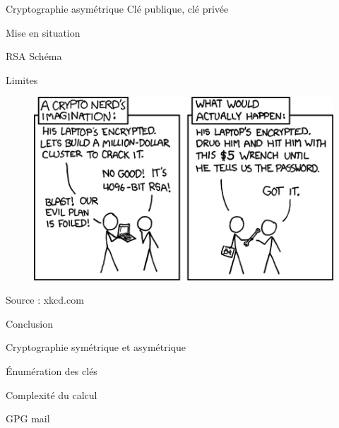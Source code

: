 \documentclass{beamer}
\begin{document}
\begin{frame}{Cryptographie asymétrique}
  Clé publique, clé privée

  Mise en situation
\end{frame}

\begin{frame}{RSA}
  Schéma
  \end{frame}

\begin{frame}{Limites}
  \begin{figure}
    \centering
    \includegraphics[scale = 0.5]{xkcdsecurity.png}
  \end{figure}
\footnotesize{Source : xkcd.com}
\end{frame}

\begin{frame}{Conclusion}
  \begin{center}
  Cryptographie symétrique et asymétrique

  Énumération des clés  

  Complexité du calcul
\end{center}

  
  GPG mail

  \end{frame}
\end{document}
